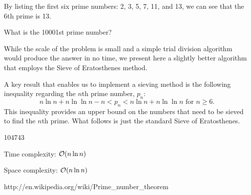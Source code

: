 




By listing the first six prime numbers: 2, 3, 5, 7, 11, and 13, we can see that the 6th prime is 13.

What is the 10001st prime number?

\solution

While the scale of the problem is small and a simple trial division algorithm would produce the answer in no time, we present here a slightly better algorithm that employs the Sieve of Eratosthenes method.

A key result that enables us to implement a sieving method is the following inequality regarding the $n$th prime number, $p_n$:
\[
n \ln n + n \ln \ln n - n < p_n < n \ln n + n \ln \ln n \text{ for $n \ge 6$}.
\]
This inequality provides an upper bound on the numbers that need to be sieved to find the $n$th prime. What follows is just the standard Sieve of Eratosthenes.

\answer

104743

\complexity

Time complexity: $\mathcal{O}(n \ln n)$

Space complexity: $\mathcal{O}(n \ln n)$


http://en.wikipedia.org/wiki/Prime\_number\_theorem

